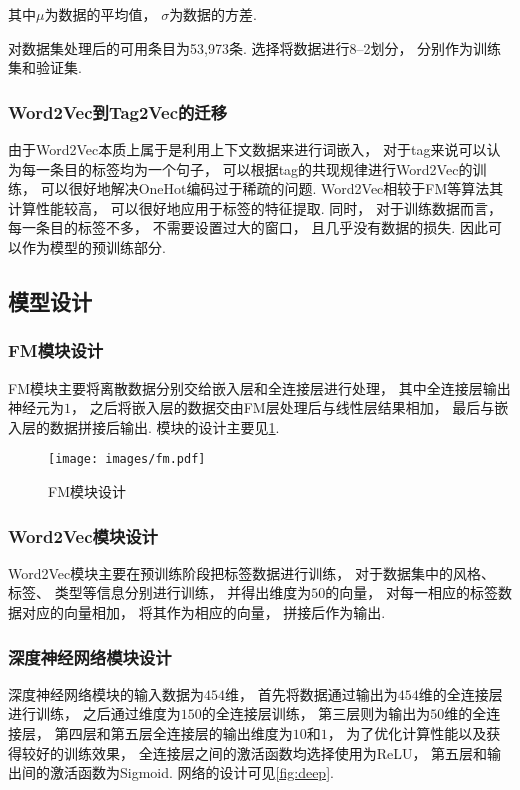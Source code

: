其中$\mu$为数据的平均值，
$\sigma$为数据的方差.

对数据集处理后的可用条目为53,973条.
选择将数据进行8--2划分，
分别作为训练集和验证集.

\subsubsection{Word2Vec到Tag2Vec的迁移}

由于Word2Vec本质上属于是利用上下文数据来进行词嵌入，
对于tag来说可以认为每一条目的标签均为一个句子，
可以根据tag的共现规律进行Word2Vec的训练，
可以很好地解决OneHot编码过于稀疏的问题.
Word2Vec相较于FM等算法其计算性能较高，
可以很好地应用于标签的特征提取.
同时，
对于训练数据而言，
每一条目的标签不多，
不需要设置过大的窗口，
且几乎没有数据的损失.
因此可以作为模型的预训练部分.

\subsection{模型设计\label{sec:design}}

\subsubsection{FM模块设计}

FM模块主要将离散数据分别交给嵌入层和全连接层进行处理，
其中全连接层输出神经元为$1$，
之后将嵌入层的数据交由FM层处理后与线性层结果相加，
最后与嵌入层的数据拼接后输出.
模块的设计主要见\cref{fig:fm}.

\begin{figure}[!htbp]
  \centering
  \texttt{[image: images/fm.pdf]}
  \caption{FM模块设计}\label{fig:fm}
\end{figure}

\subsubsection{Word2Vec模块设计}

Word2Vec模块主要在预训练阶段把标签数据进行训练，
对于数据集中的风格、
标签、
类型等信息分别进行训练，
并得出维度为$50$的向量，
对每一相应的标签数据对应的向量相加，
将其作为相应的向量，
拼接后作为输出.

\subsubsection{深度神经网络模块设计}

深度神经网络模块的输入数据为$454$维，
首先将数据通过输出为$454$维的全连接层进行训练，
之后通过维度为$150$的全连接层训练，
第三层则为输出为$50$维的全连接层，
第四层和第五层全连接层的输出维度为$10$和$1$，
为了优化计算性能以及获得较好的训练效果，
全连接层之间的激活函数均选择使用为ReLU，
第五层和输出间的激活函数为Sigmoid.
网络的设计可见\cref{fig:deep}.

